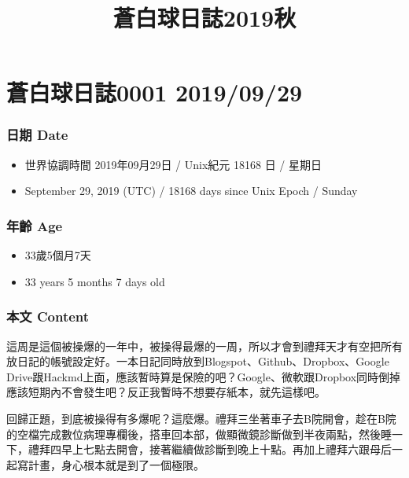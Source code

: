 \documentclass[a5paper, 12pt
]{book}
\date{}
\title{蒼白球日誌2019秋}
\providecommand{\tightlist}{%
  \setlength{\itemsep}{0pt}\setlength{\parskip}{0pt}}
\begin{document}
\maketitle
\newpage\null\thispagestyle{empty}\newpage
\frontmatter
\tableofcontents

\mainmatter
\hypertarget{ux84bcux767dux7403ux65e5ux8a8c0001-20190929}{%
\section{蒼白球日誌0001
2019/09/29}\label{ux84bcux767dux7403ux65e5ux8a8c0001-20190929}}

\hypertarget{ux65e5ux671f-date}{%
\subsubsection{日期 Date}\label{ux65e5ux671f-date}}

\begin{itemize}
\tightlist
\item
  世界協調時間 2019年09月29日 / Unix紀元 18168 日 / 星期日
\item
  September 29, 2019 (UTC) / 18168 days since Unix Epoch / Sunday
\end{itemize}

\hypertarget{ux5e74ux9f61-age}{%
\subsubsection{年齡 Age}\label{ux5e74ux9f61-age}}

\begin{itemize}
\tightlist
\item
  33歲5個月7天
\item
  33 years 5 months 7 days old
\end{itemize}

\hypertarget{ux672cux6587-content}{%
\subsubsection{本文 Content}\label{ux672cux6587-content}}

這周是這個被操爆的一年中，被操得最爆的一周，所以才會到禮拜天才有空把所有放日記的帳號設定好。一本日記同時放到Blogspot、Github、Dropbox、Google
Drive跟Hackmd上面，應該暫時算是保險的吧？Google、微軟跟Dropbox同時倒掉應該短期內不會發生吧？反正我暫時不想要存紙本，就先這樣吧。

回歸正題，到底被操得有多爆呢？這麼爆。禮拜三坐著車子去B院開會，趁在B院的空檔完成數位病理專欄後，搭車回本部，做顯微鏡診斷做到半夜兩點，然後睡一下，禮拜四早上七點去開會，接著繼續做診斷到晚上十點。再加上禮拜六跟母后一起寫計畫，身心根本就是到了一個極限。
\end{document}
